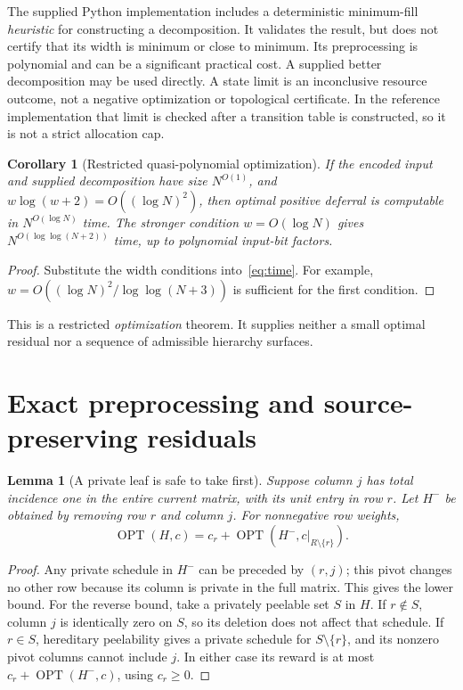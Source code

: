 \documentclass[11pt,a4paper]{article}
\newtheorem{lemma}[theorem]{Lemma}
\newtheorem{corollary}[theorem]{Corollary}
\theoremstyle{definition}
\theoremstyle{remark}
\newcommand{\OPT}{\operatorname{OPT}}
\begin{document}
The supplied Python implementation includes a deterministic minimum-fill
\emph{heuristic} for constructing a decomposition. It validates the result,
but does not certify that its width is minimum or close to minimum. Its
preprocessing is polynomial and can be a significant practical cost. A
supplied better decomposition may be used directly. A state limit is an
inconclusive resource outcome, not a negative optimization or topological
certificate. In the reference implementation that limit is checked after
a transition table is constructed, so it is not a strict allocation cap.

\begin{corollary}[Restricted quasi-polynomial optimization]
\label{cor:qp}
If the encoded input and supplied decomposition have size $N^{O(1)}$, and
$w\log(w+2)=O((\log N)^2)$, then optimal positive deferral is computable in
$N^{O(\log N)}$ time. The stronger condition $w=O(\log N)$ gives
$N^{O(\log\log(N+2))}$ time, up to polynomial input-bit factors.
\end{corollary}
\begin{proof}
Substitute the width conditions into~\eqref{eq:time}. For example,
$w=O((\log N)^2/\log\log(N+3))$ is sufficient for the first condition.
\end{proof}

This is a restricted \emph{optimization} theorem. It supplies neither a
small optimal residual nor a sequence of admissible hierarchy surfaces.

\section{Exact preprocessing and source-preserving residuals}
\label{sec:preprocess}

\begin{lemma}[A private leaf is safe to take first]
\label{lem:forced}
Suppose column $j$ has total incidence one in the entire current matrix,
with its unit entry in row $r$. Let $H^-$ be obtained by removing row $r$
and column $j$. For nonnegative row weights,
\[
 \OPT(H,c)=c_r+\OPT(H^-,c|_{R\setminus\{r\}}).
\]
\end{lemma}
\begin{proof}
Any private schedule in $H^-$ can be preceded by $(r,j)$; this pivot
changes no other row because its column is private in the full matrix.
This gives the lower bound. For the reverse bound, take a privately
peelable set $S$ in $H$. If $r\notin S$, column $j$ is identically zero
on $S$, so its deletion does not affect that schedule. If $r\in S$,
hereditary peelability gives a private schedule for $S\setminus\{r\}$,
and its nonzero pivot columns cannot include $j$. In either case its
reward is at most $c_r+\OPT(H^-,c)$, using $c_r\geq0$.
\end{proof}
\end{document}
